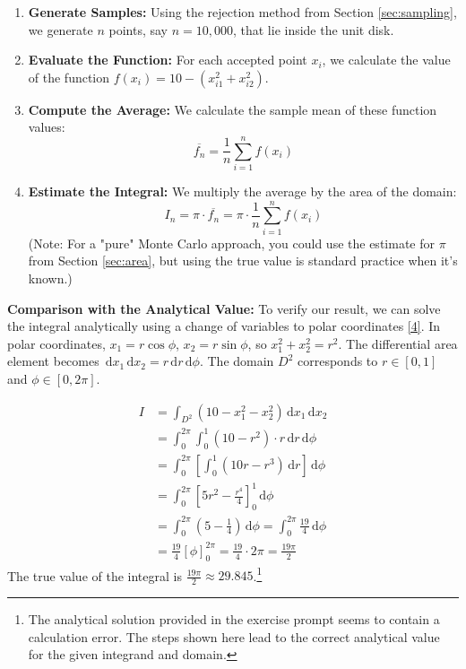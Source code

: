 \documentclass[11pt,a4paper]{article}
\newcommand{\dd}{\,\mathrm{d}}
\begin{document}
\begin{enumerate}
    \item \textbf{Generate Samples:} Using the rejection method from Section \ref{sec:sampling}, we generate $n$ points, say $n=10,000$, that lie inside the unit disk.
    \item \textbf{Evaluate the Function:} For each accepted point $x_i$, we calculate the value of the function $f(x_i) = 10 - (x_{i1}^2 + x_{i2}^2)$.
    \item \textbf{Compute the Average:} We calculate the sample mean of these function values:
    \[
    \overline{f_n} = \frac{1}{n} \sum_{i=1}^n f(x_i)
    \]
    \item \textbf{Estimate the Integral:} We multiply the average by the area of the domain:
    \[
    I_n = \pi \cdot \overline{f_n} = \pi \cdot \frac{1}{n} \sum_{i=1}^n f(x_i)
    \]
    (Note: For a "pure" Monte Carlo approach, you could use the estimate for $\pi$ from Section \ref{sec:area}, but using the true value is standard practice when it's known.)
\end{enumerate}

\textbf{Comparison with the Analytical Value:}
To verify our result, we can solve the integral analytically using a change of variables to polar coordinates \hyperlink{note4}{[4]}. In polar coordinates, $x_1 = r\cos\phi$, $x_2 = r\sin\phi$, so $x_1^2 + x_2^2 = r^2$. The differential area element becomes $\dd x_1 \dd x_2 = r \dd r \dd\phi$. The domain $D^2$ corresponds to $r \in [0, 1]$ and $\phi \in [0, 2\pi]$.

\begin{align*}
    I &= \int_{D^2} (10 - x_1^2 - x_2^2) \dd x_1 \dd x_2 \\
      &= \int_{0}^{2\pi} \int_{0}^{1} (10 - r^2) \cdot r \dd r \dd\phi \\
      &= \int_{0}^{2\pi} \left[ \int_{0}^{1} (10r - r^3) \dd r \right] \dd\phi \\
      &= \int_{0}^{2\pi} \left[ 5r^2 - \frac{r^4}{4} \right]_{0}^{1} \dd\phi \\
      &= \int_{0}^{2\pi} \left( 5 - \frac{1}{4} \right) \dd\phi = \int_{0}^{2\pi} \frac{19}{4} \dd\phi \\
      &= \frac{19}{4} [\phi]_{0}^{2\pi} = \frac{19}{4} \cdot 2\pi = \frac{19\pi}{2}
\end{align*}
The true value of the integral is $\frac{19\pi}{2} \approx 29.845$.\footnote{The analytical solution provided in the exercise prompt seems to contain a calculation error. The steps shown here lead to the correct analytical value for the given integrand and domain.}
\end{document}
